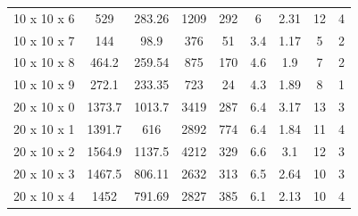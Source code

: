 \documentclass{article}
\begin{document}
\begin{table}[]
\begin{tabular}{lcccccccc}
	     		10 x 10 x 6                     & 529                          & 283.26                       & 1209                     & 292                      & 6                            & 2.31                         & 12                       & 4                        \\
	     		10 x 10 x 7                     & 144                          & 98.9                         & 376                      & 51                       & 3.4                          & 1.17                         & 5                        & 2                        \\
	     		10 x 10 x 8                     & 464.2                        & 259.54                       & 875                      & 170                      & 4.6                          & 1.9                          & 7                        & 2                        \\
	     		10 x 10 x 9                     & 272.1                        & 233.35                       & 723                      & 24                       & 4.3                          & 1.89                         & 8                        & 1                        \\
	     		20 x 10 x 0                     & 1373.7                       & 1013.7                       & 3419                     & 287                      & 6.4                          & 3.17                         & 13                       & 3                        \\
	     		20 x 10 x 1                     & 1391.7                       & 616                          & 2892                     & 774                      & 6.4                          & 1.84                         & 11                       & 4                        \\
	     		20 x 10 x 2                     & 1564.9                       & 1137.5                       & 4212                     & 329                      & 6.6                          & 3.1                          & 12                       & 3                        \\
	     		20 x 10 x 3                     & 1467.5                       & 806.11                       & 2632                     & 313                      & 6.5                          & 2.64                         & 10                       & 3                        \\
	     		20 x 10 x 4                     & 1452                         & 791.69                       & 2827                     & 385                      & 6.1                          & 2.13                         & 10                       & 4                        \\

\end{tabular}
\end{table}
\end{document}
